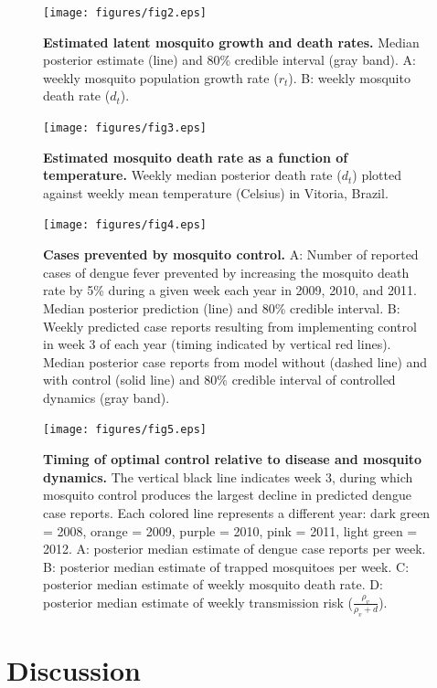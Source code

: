 \documentclass[10pt,letterpaper]{article}
\begin{document}
\begin{figure}[!h]
\texttt{[image: figures/fig2.eps]}
\caption{{\bf Estimated latent mosquito growth and death rates.}
Median posterior estimate (line) and 80\% credible interval (gray band).  A: weekly mosquito population growth rate ($r_t$). B: weekly mosquito death rate ($d_t$).
}
\label{latent}
\end{figure}

\begin{figure}[!h]
\texttt{[image: figures/fig3.eps]}
\caption{{\bf Estimated mosquito death rate as a function of temperature.}
Weekly median posterior death rate ($d_t$) plotted against weekly mean temperature (Celsius) in Vitoria, Brazil.
}
\label{temp}
\end{figure}

\begin{figure}[!h]
\texttt{[image: figures/fig4.eps]}
\caption{{\bf Cases prevented by mosquito control.}
A: Number of reported cases of dengue fever prevented by increasing the mosquito death rate by 5\% during a given week each year in 2009, 2010, and 2011. Median posterior prediction (line) and 80\% credible interval. B: Weekly predicted case reports resulting from implementing control in week 3 of each year (timing indicated by vertical red lines).  Median posterior case reports from model without (dashed line) and with control (solid line) and 80\% credible interval of controlled dynamics (gray band).
}
\label{control}
\end{figure}

\begin{figure}[!h]
\texttt{[image: figures/fig5.eps]}
\caption{{\bf Timing of optimal control relative to disease and mosquito dynamics.}
The vertical black line indicates week 3, during which mosquito control produces the largest decline in predicted dengue case reports. Each colored line represents a different year: dark green = 2008, orange = 2009, purple = 2010, pink = 2011, light green = 2012. A: posterior median estimate of dengue case reports per week. B: posterior median estimate of trapped mosquitoes per week. C: posterior median estimate of weekly mosquito death rate. D: posterior median estimate of weekly transmission risk ($\frac{\rho_v}{\rho_v + d}$).
}
\label{timing}
\end{figure}

\section*{Discussion}
\end{document}
